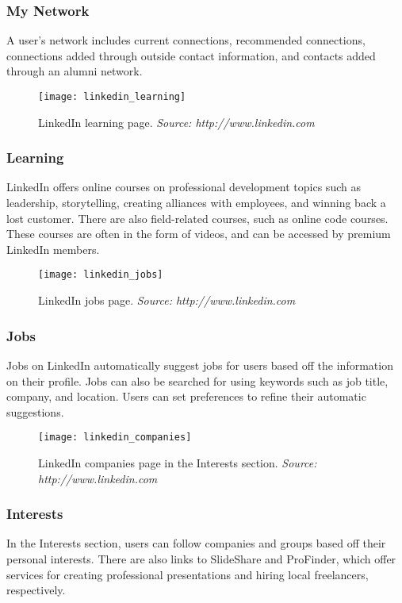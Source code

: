 \subsubsection{My Network}
A user's network includes current connections, recommended connections, connections added through outside contact information, and contacts added through an alumni network. 

\begin{figure}[h]
\centering
\texttt{[image: linkedin\_learning]}
\caption{LinkedIn learning page. \textit{Source: http://www.linkedin.com}}
\end{figure}
\subsubsection{Learning}
LinkedIn offers online courses on professional development topics such as leadership, storytelling, creating alliances with employees, and winning back a lost customer. There are also field-related courses, such as online code courses. These courses are often in the form of videos, and can be accessed by premium LinkedIn members. 

\begin{figure}[h]
\centering
\texttt{[image: linkedin\_jobs]}
\caption{LinkedIn jobs page. \textit{Source: http://www.linkedin.com}}
\end{figure}
\subsubsection{Jobs}
Jobs on LinkedIn automatically suggest jobs for users based off the information on their profile. Jobs can also be searched for using keywords such as job title, company, and location. Users can set preferences to refine their automatic suggestions.

\begin{figure}[h]
\centering
\texttt{[image: linkedin\_companies]}
\caption{LinkedIn companies page in the Interests section. \textit{Source: http://www.linkedin.com}}
\end{figure}
\subsubsection{Interests}
In the Interests section, users can follow companies and groups based off their personal interests. There are also links to SlideShare and ProFinder, which offer services for creating professional presentations and hiring local freelancers, respectively.

